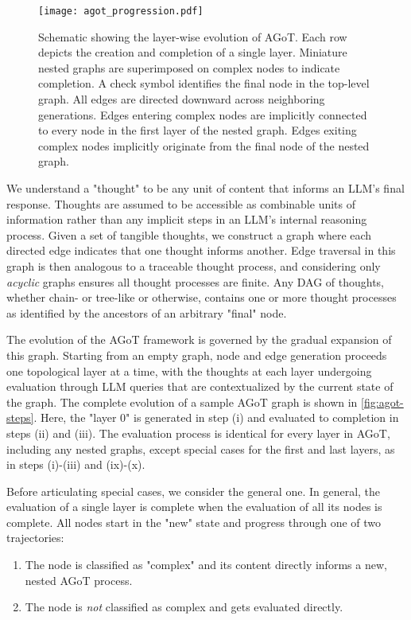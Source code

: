 \documentclass{article}
\begin{document}
\begin{figure}
    \centering
    \texttt{[image: agot\_progression.pdf]}
    \caption{Schematic showing the layer-wise evolution of AGoT. Each row depicts the creation and completion of a single layer. Miniature nested graphs are superimposed on complex nodes to indicate completion. A check symbol identifies the final node in the top-level graph. All edges are directed downward across neighboring generations. Edges entering complex nodes are implicitly connected to every node in the first layer of the nested graph. Edges exiting complex nodes implicitly originate from the final node of the nested graph.}
    \label{fig:agot-steps}
\end{figure}




We understand a "thought" to be any unit of content that informs an LLM's final response. Thoughts are assumed to be accessible as combinable units of information rather than any implicit steps in an LLM's internal reasoning process. Given a set of tangible thoughts, we construct a graph where each directed edge indicates that one thought informs another. Edge traversal in this graph is then analogous to a traceable thought process, and considering only \textit{acyclic} graphs ensures all thought processes are finite. Any DAG of thoughts, whether chain- or tree-like or otherwise, contains one or more thought processes as identified by the ancestors of an arbitrary "final" node.

The evolution of the AGoT framework is governed by the gradual expansion of this graph. Starting from an empty graph, node and edge generation proceeds one topological layer at a time, with the thoughts at each layer undergoing evaluation through LLM queries that are contextualized by the current state of the graph. The complete evolution of a sample AGoT graph is shown in \autoref{fig:agot-steps}. Here, the "layer 0" is generated in step (i) and evaluated to completion in steps (ii) and (iii). The evaluation process is identical for every layer in AGoT, including any nested graphs, except special cases for the first and last layers, as in steps (i)-(iii) and (ix)-(x). 

Before articulating special cases, we consider the general one. In general, the evaluation of a single layer is complete when the evaluation of all its nodes is complete. All nodes start in the "new" state and progress through one of two trajectories:

\begin{enumerate}
    \item The node is classified as "complex" and its content directly informs a new, nested AGoT process.
    \item The node is \textit{not} classified as complex and gets evaluated directly.
\end{enumerate}
\end{document}
